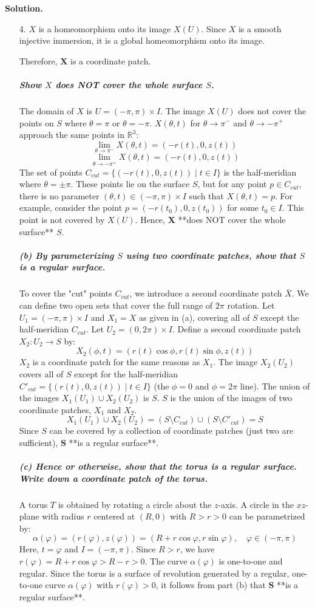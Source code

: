 \documentclass[12pt, a4paper, oneside]{article}
\newenvironment{solution}
  {\par\noindent\textbf{Solution. }\newline}
  {\par}
\begin{document}
\begin{solution}
\begin{enumerate}
    \item[4.] $X$ is a homeomorphism onto its image $X(U)$. Since $X$ is a smooth injective immersion, it is a global homeomorphism onto its image.

    Therefore, $\mathbf{X}$ is a coordinate patch.

    \subparagraph{Show $X$ does NOT cover the whole surface $S$.}
    The domain of $X$ is $U=(-\pi, \pi)\times I$. The image $X(U)$ does not cover the points on $S$ where $\theta=\pi$ or $\theta=-\pi$.
    $X(\theta, t)$ for $\theta \to \pi^-$ and $\theta \to -\pi^+$ approach the same points in $\mathbb{R}^3$:
    $$
    \lim_{\theta \to \pi^-} X(\theta, t) = (-r(t), 0, z(t))
    $$
    $$
    \lim_{\theta \to -\pi^+} X(\theta, t) = (-r(t), 0, z(t))
    $$
    The set of points $C_{cut} = \{(-r(t), 0, z(t)) \mid t \in I\}$ is the half-meridian where $\theta = \pm \pi$. These points lie on the surface $S$, but for any point $p \in C_{cut}$, there is no parameter $(\theta, t) \in (-\pi, \pi)\times I$ such that $X(\theta, t)=p$.
    For example, consider the point $p = (-r(t_0), 0, z(t_0))$ for some $t_0 \in I$. This point is not covered by $X(U)$.
    Hence, $\mathbf{X}$ **does NOT cover the whole surface** $S$.

\subparagraph{(b) By parameterizing $S$ using two coordinate patches, show that $S$ is a regular surface.}
To cover the "cut" points $C_{cut}$, we introduce a second coordinate patch $\bar{X}$. We can define two open sets that cover the full range of $2\pi$ rotation.
Let $U_1 = (-\pi, \pi) \times I$ and $X_1 = X$ as given in (a), covering all of $S$ except the half-meridian $C_{cut}$.
Let $U_2 = (0, 2\pi) \times I$. Define a second coordinate patch $X_2: U_2 \rightarrow S$ by:
$$
X_2(\phi, t) = (r(t)\cos\phi, r(t)\sin\phi, z(t))
$$
$X_2$ is a coordinate patch for the same reasons as $X_1$.
The image $X_2(U_2)$ covers all of $S$ except for the half-meridian $C'_{cut} = \{(r(t), 0, z(t)) \mid t \in I\}$ (the $\phi=0$ and $\phi=2\pi$ line).
The union of the images $X_1(U_1) \cup X_2(U_2)$ is $S$.
$S$ is the union of the images of two coordinate patches, $X_1$ and $X_2$.
$$
X_1(U_1) \cup X_2(U_2) = (S \setminus C_{cut}) \cup (S \setminus C'_{cut}) = S
$$
Since $S$ can be covered by a collection of coordinate patches (just two are sufficient), $\mathbf{S}$ **is a regular surface**.

\subparagraph{(c) Hence or otherwise, show that the torus is a regular surface. Write down a coordinate patch of the torus.}
A torus $T$ is obtained by rotating a circle about the $z$-axis. A circle in the $xz$-plane with radius $r$ centered at $(R, 0)$ with $R>r>0$ can be parametrized by:
$$
\alpha(\varphi) = (r(\varphi), z(\varphi)) = (R + r\cos\varphi, r\sin\varphi), \quad \varphi \in (-\pi, \pi)
$$
Here, $t=\varphi$ and $I=(-\pi, \pi)$.
Since $R>r$, we have $r(\varphi) = R+r\cos\varphi > R-r > 0$. The curve $\alpha(\varphi)$ is one-to-one and regular.
Since the torus is a surface of revolution generated by a regular, one-to-one curve $\alpha(\varphi)$ with $r(\varphi)>0$, it follows from part (b) that $\mathbf{S}$ **is a regular surface**.


\end{enumerate}
\end{solution}
\end{document}
